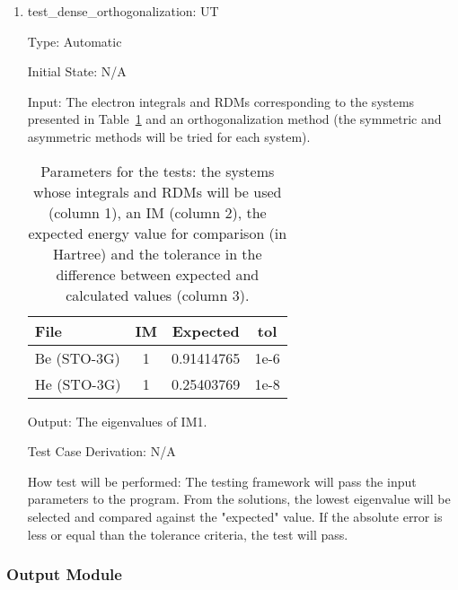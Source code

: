 \documentclass[12pt, titlepage]{article}
\newcounter{utnum} %
\begin{document}
\begin{enumerate}
	
	\item{test\_dense\_orthogonalization: UT\theutnum 
		\label{UT10}\\}
	
	Type: Automatic
	
	Initial State: N/A
	
	Input: The electron integrals and RDMs corresponding to the systems 
	presented in Table~\ref{table:solver} and an orthogonalization method (the 
	symmetric and asymmetric methods will be tried for each system).

	
	\begin{table}[h!]
		\centering
		\begin{tabular}{l c c c }
			\textbf{File} & IM & \textbf{Expected}&\textbf{tol}\\
			\midrule
			Be (STO-3G) & 1 & 0.91414765& 1e-6\\			
			He (STO-3G) & 1 & 0.25403769& 1e-8\\
		\end{tabular}
		\caption{Parameters for the tests: the systems whose integrals and RDMs 
		will be used (column 1), an IM (column 2), the expected energy value 
		for comparison (in Hartree) and the tolerance in the difference between 
		expected and calculated values (column 3).}
		\label{table:solver}
	\end{table}
	
	Output: The eigenvalues of IM1.
	
	Test Case Derivation: N/A
	
	How test will be performed: The testing framework will pass the input 
	parameters to the program. From the 
	solutions, the lowest eigenvalue will be selected and compared 
	against the "expected" value. If the absolute error is less or 
	equal than the tolerance criteria, the test will pass.

	
\end{enumerate}

\subsubsection{Output Module}
\label{sec:M13}
\end{document}
